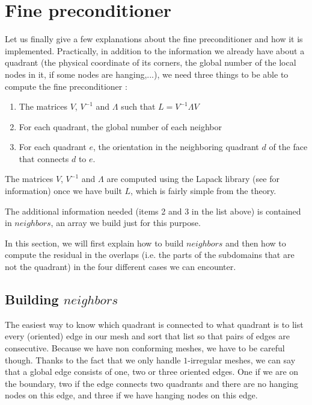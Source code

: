 \section{Fine preconditioner}

Let us finally give a few explanations about the fine preconditioner and how it is implemented. Practically, in addition to the information we already have about a quadrant (the physical coordinate of its corners, the global number of the local nodes in it, if some nodes are hanging,...), we need three things to be able to compute the fine preconditioner : 

\begin{enumerate}
\item The matrices $V$, $V^{-1}$ and $\Lambda$ such that $L=V^{-1}\Lambda V$
\item For each quadrant, the global number of each neighbor
\item For each quadrant $e$, the orientation in the neighboring quadrant $d$ of the face that connects $d$ to $e$. 
\end{enumerate} 

The matrices $V$, $V^{-1}$ and $\Lambda$ are computed using the Lapack library (see \cite{lapack} for information) once we have built $L$, which is fairly simple from the theory.

The additional information needed (items 2 and 3 in the list above) is contained in $neighbors$, an array we build just for this purpose. 

In this section, we will first explain how to build $neighbors$ and then how to compute the residual in the overlaps (i.e. the parts of the subdomains that are not the quadrant) in the four different cases we can encounter. 


\subsection{Building $neighbors$}

The easiest way to know which quadrant is connected to what quadrant is to list every (oriented) edge in our mesh and sort that list so that pairs of edges are consecutive. Because we have non conforming meshes, we have to be careful though. Thanks to the fact that we only handle $1$-irregular meshes, we can say that a global edge consists of one, two or three oriented edges. One if we are on the boundary, two if the edge connects two quadrants and there are no hanging nodes on this edge, and three if we have hanging nodes on this edge. 


